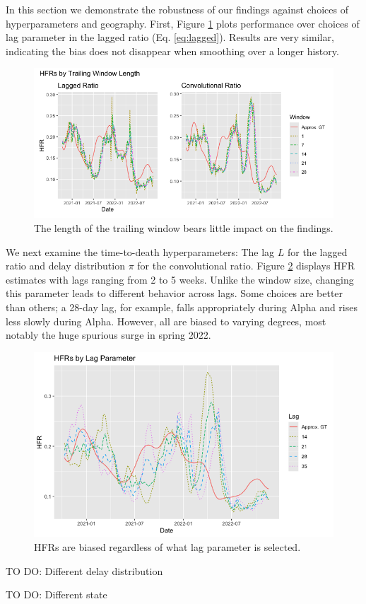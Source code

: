 \documentclass{article}
\begin{document}
In this section we demonstrate the robustness of our findings against choices of hyperparameters and geography. First, Figure \ref{fig:window} plots performance over choices of lag parameter in the lagged ratio (Eq. \ref{eq:lagged}). Results are very similar, indicating the bias does not disappear when smoothing over a longer history.

\begin{figure}
    \centering
    \includegraphics[width=0.75\linewidth]{Figs/window_size.png}
    \caption{The length of the trailing window bears little impact on the findings.}
    \label{fig:window}
\end{figure}

We next examine the time-to-death hyperparameters: The lag $L$ for the lagged ratio and delay distribution $\pi$ for the convolutional ratio. Figure \ref{fig:lag} displays HFR estimates with lags ranging from 2 to 5 weeks. Unlike the window size, changing this parameter leads to different behavior across lags. Some choices are better than others; a 28-day lag, for example, falls appropriately during Alpha and rises less slowly during Alpha. However, all are biased to varying degrees, most notably the huge spurious surge in spring 2022.

\begin{figure}
    \centering
    \includegraphics[width=0.7\linewidth]{Figs/hfrs_by_lag.png}
    \caption{HFRs are biased regardless of what lag parameter is selected.}
    \label{fig:lag}
\end{figure}

TO DO: Different delay distribution

TO DO: Different state
\end{document}
